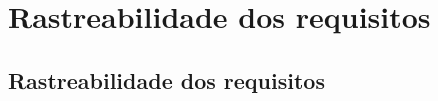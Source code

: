 \part{Rastreabilidade dos requisitos}
\chapter[Rastreabilidade dos requisitos]{Rastreabilidade dos requisitos}